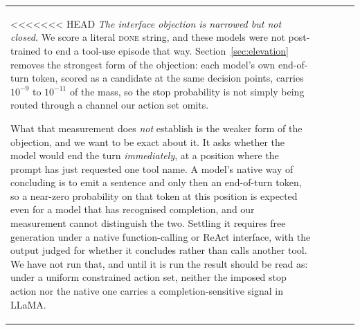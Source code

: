 \documentclass[11pt]{article}
\begin{document}
\begin{table}[t]
\begin{tabular}{lcccc}
<<<<<<< HEAD
\emph{The interface objection is narrowed but not closed.} We score a literal
\textsc{done} string, and these models were not post-trained to end a tool-use
episode that way. Section~\ref{sec:elevation} removes the strongest form of the
objection: each model's own end-of-turn token, scored as a candidate at the same
decision points, carries $10^{-9}$ to $10^{-11}$ of the mass, so the stop
probability is not simply being routed through a channel our action set omits.

What that measurement does \emph{not} establish is the weaker form of the
objection, and we want to be exact about it. It asks whether the model would end
the turn \emph{immediately}, at a position where the prompt has just requested
one tool name. A model's native way of concluding is to emit a sentence and only
then an end-of-turn token, so a near-zero probability on that token at this
position is expected even for a model that has recognised completion, and our
measurement cannot distinguish the two. Settling it requires free generation
under a native function-calling or ReAct interface, with the output judged for
whether it concludes rather than calls another tool. We have not run that, and
until it is run the result should be read as: under a uniform constrained action
set, neither the imposed stop action nor the native one carries a
completion-sensitive signal in LLaMA.


\end{tabular}
\end{table}
\end{document}
